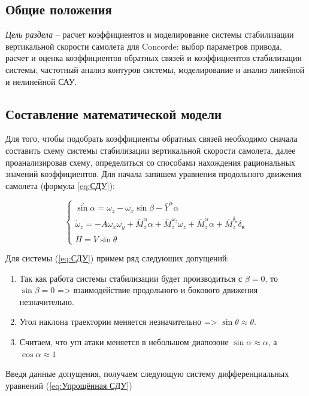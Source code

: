 
\subsection{Общие положения}

\textit{Цель раздела} -- расчет коэффициентов и моделирование системы стабилизации вертикальной скорости самолета для Concorde: выбор параметров привода, расчет и оценка коэффициентов обратных связей и коэффициентов стабилизации системы, частотный анализ контуров системы, моделирование и анализ линейной и нелинейной САУ. 


\subsection{Составление математической модели}

Для того, чтобы подобрать коэффициенты обратных связей необходимо сначала составить схему системы стабилизации вертикальной скорости самолета, далее проанализировав схему, определиться со способами нахождения рациональных значений коэффициентов. Для начала запишем уравнения продольного движения самолета (формула \ref{eq:СДУ}):

\begin{equation}
    \label{eq:СДУ}
    \begin{cases}
        \dot{\sin{\alpha}}=\omega_z-\omega_x \sin{\beta}-\bar{Y}^{\alpha} \alpha \\
        \dot{\omega}_z=-A \omega_x \omega_y+\bar{M}_z^{\alpha} \alpha+\bar{M}_z^{\omega_z} \omega_z +\bar{M}_z^{\dot{\alpha}} \dot{\alpha}+\bar{M}_z^{\delta_{\text{в}}} \delta_{\text{в}} \\
        \dot{H}=V\sin{\theta}
    \end{cases}
\end{equation}

Для системы (\ref{eq:СДУ}) примем ряд следующих допущений:
\begin{enumerate}
    \item Так как работа системы стабилизации будет производиться с $\beta=0$, то $\sin{\beta}=0$ => взаимодействие продольного и бокового движения незначительно.
    \item Угол наклона траектории меняется незначительно => $\sin{\theta} \approx \theta$.
    \item Считаем, что угл атаки меняется в небольшом диапозоне $\sin{\alpha} \approx \alpha$, а $\cos{\alpha} \approx 1$
\end{enumerate}

Введя данные допущения, получаем следующую систему дифференциальных уравнений (\ref{eq:Упрощённая СДУ})

